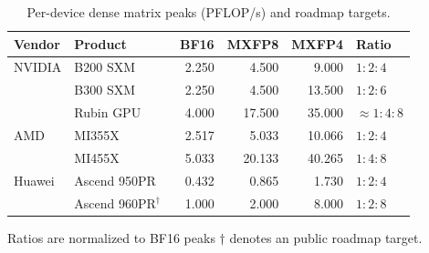 \begin{table}[t]
\centering
\caption{Per-device dense matrix peaks (PFLOP/s) and roadmap targets.}
\label{tab:vendor_ratios}
\begingroup\footnotesize\setlength{\tabcolsep}{2pt}
\begin{tabular*}{\columnwidth}{@{\extracolsep{\fill}}llrrrl@{}}
\toprule
Vendor & Product & BF16 & MXFP8 & MXFP4 & Ratio \\
\midrule
NVIDIA & B200 SXM~\cite{nvidiahgx}
 & 2.250 & 4.500 & 9.000 & $1:2:4$ \\
 & B300 SXM~\cite{nvidiahgx}
 & 2.250 & 4.500 & 13.500 & $1:2:6$ \\
 & Rubin GPU~\cite{nvidiaverarubin}
 & 4.000 & 17.500 & 35.000 & $\approx 1:4:8$ \\
\midrule
AMD & MI355X~\cite{amdmi355x}
 & 2.517 & 5.033 & 10.066 & $1:2:4$ \\
 & MI455X~\cite{amdmi455x}
 & 5.033 & 20.133 & 40.265 & $1:4:8$ \\
\midrule
Huawei & Ascend 950PR~\cite{huawei950}
 & 0.432 & 0.865 & 1.730 & $1:2:4$ \\
 & Ascend 960PR$^\dagger$~\cite{huawei960roadmap}
 & 1.000 & 2.000 & 8.000 & $1:2:8$ \\
\bottomrule
\end{tabular*}
\par\smallskip
\parbox{\columnwidth}{\raggedright
Ratios are normalized to BF16 peaks
$\dagger$ denotes an public roadmap target.}
\endgroup
\end{table}
